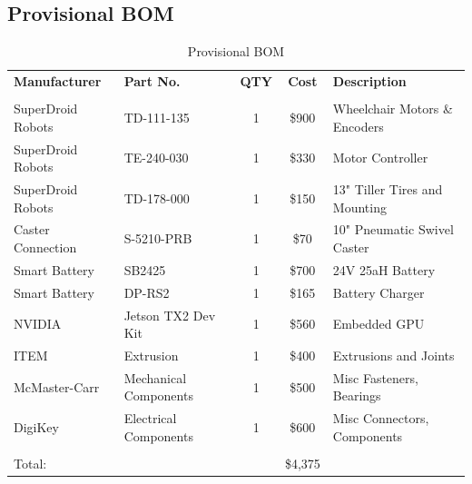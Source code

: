 \documentclass[12pt]{extarticle}
\begin{document}
\subsection{Provisional BOM}
\begin{table}[H]
\centering
\def\arraystretch{1.1}
\caption{Provisional BOM}
\label{Tab:provisional_bom}
\begin{tabular}{ llccl }
\hline
    \sffamily\textbf{Manufacturer} & \sffamily\textbf{Part No.} & \sffamily\textbf{QTY} & \sffamily\textbf{Cost} & \sffamily\textbf{Description}\\
    \\[-.8ex]
    SuperDroid Robots & TD-111-135 & 1 & \$900 & Wheelchair Motors \& Encoders \\
	SuperDroid Robots & TE-240-030 & 1 & \$330 & Motor Controller \\
	SuperDroid Robots & TD-178-000 & 1 & \$150 & 13" Tiller Tires and Mounting \\
	Caster Connection & S-5210-PRB & 1 & \$70 & 10" Pneumatic Swivel Caster \\
	Smart Battery & SB2425 & 1 & \$700 & 24V 25aH Battery \\
    Smart Battery & DP-RS2 & 1 & \$165 & Battery Charger \\
    NVIDIA & Jetson TX2 Dev Kit & 1 & \$560 &  Embedded GPU \\
	ITEM & Extrusion & 1 & \$400 & Extrusions and Joints \\
	McMaster-Carr & Mechanical Components & 1 & \$500 & Misc Fasteners, Bearings \\
	DigiKey & Electrical Components & 1 & \$600 & Misc Connectors, Components \\[.5ex]
	\hline 
	\\[-2ex]
	Total: &&& \$4,375 &\\
	
    
\end{tabular}
\end{table}
\end{document}
